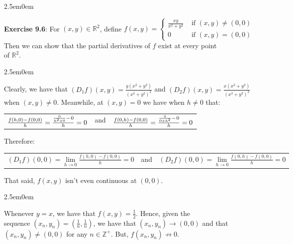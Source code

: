 \documentclass{book}
\newcommand{\exOne}{%
   \color{Purple}%
   \fontsize{14}{16}\selectfont%
}
\newcommand{\exTwo}{%
   \color{RedViolet}%
   \fontsize{13}{15}\selectfont%
}
\newenvironment{myIndent}{%
   \begin{adjustwidth}{2.5em}{0em}%
}{%
   \end{adjustwidth}%
}
\newcommand{\retTwo}{\hfill\bigbreak}
\begin{document}
{\begin{myIndent}\exOne
   \textbf{Exercise 9.6}: For $(x, y) \in \mathbb{R}^2$, define $f(x, y) = \left\{
   \begin{matrix}
      \frac{xy}{x^2 + y^2} & \text{ if } (x, y) \neq (0, 0) \\
      0 & \text{ if } (x, y) = (0, 0)
   \end{matrix}\right.$\\ [6pt]
   Then we can show that the partial derivatives of $f$ exist at every point\\ of $\mathbb{R}^2$.
   {\begin{myIndent}\exTwo
      Clearly, we have that $(D_1f)(x, y) = \frac{y(x^2 + y^2)}{(x^2 + y^2)^2}$ and $(D_2f)(x, y) = \frac{x(x^2 + y^2)}{(x^2 + y^2)^2}$\\ when $(x, y) \neq 0$. Meanwhile, at $(x, y) = 0$ we have when $h \neq 0$ that:
      {\begin{center}\fontsize{12}{14}\selectfont
         \begin{tabular}{c c c}
            $\frac{f(h, 0) - f(0, 0)}{h} = \frac{\frac{0}{h^2 + 0} -\hspace{0.1em} 0}{h} = 0$ & and & $\frac{f(0, h) - f(0, 0)}{h} = \frac{\frac{0}{0 + h^2} -\hspace{0.1em}0}{h} = 0$
         \end{tabular}\retTwo
      \end{center}}

      Therefore:\\ [-16pt]

      \begin{center}{\fontsize{11.7}{13}\selectfont
         \begin{tabular}{c c c}
            $(D_1f)(0, 0) = \lim\limits_{h\rightarrow 0}\frac{f(h, 0) - f(0, 0)}{h} = 0$ & and & $(D_2f)(0, 0) = \lim\limits_{h\rightarrow 0}\frac{f(0, h) - f(0, 0)}{h} = 0$
         \end{tabular}}\retTwo
      \end{center}
   \end{myIndent}}

   That said, $f(x, y)$ isn't even continuous at $(0, 0)$.
   {\begin{myIndent}\exTwo
      Whenever $y = x$, we have that $f(x, y) = \frac{1}{2}$. Hence, given the\\ sequence $(x_n, y_n) = (\frac{1}{n}, \frac{1}{n})$, we have that $(x_n, y_n) \rightarrow (0, 0)$ and that\\ $(x_n, y_n) \neq (0, 0)$ for any $n \in \mathbb{Z}^+$. But, $f(x_n, y_n) \not\rightarrow 0$.\retTwo
      

\end{myIndent}}
\end{myIndent}}
\end{document}
